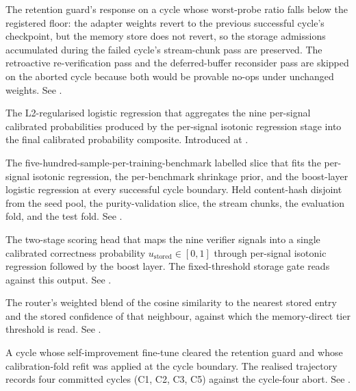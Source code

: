\begin{description}[style=nextline, leftmargin=0pt, labelindent=0pt, itemsep=6pt, parsep=0pt, font=\bfseries, beginpenalty=10000]

\item[Asymmetric rollback.] The retention guard's response on a cycle whose worst-probe ratio falls below the registered floor: the adapter weights revert to the previous successful cycle's checkpoint, but the memory store does not revert, so the storage admissions accumulated during the failed cycle's stream-chunk pass are preserved. The retroactive re-verification pass and the deferred-buffer reconsider pass are skipped on the aborted cycle because both would be provable no-ops under unchanged weights. See .

\item[Boost layer.] The L2-regularised logistic regression that aggregates the nine per-signal calibrated probabilities produced by the per-signal isotonic regression stage into the final calibrated probability composite. Introduced at .

\item[Calibration fold.] The five-hundred-sample-per-training-benchmark labelled slice that fits the per-signal isotonic regression, the per-benchmark shrinkage prior, and the boost-layer logistic regression at every successful cycle boundary. Held content-hash disjoint from the seed pool, the purity-validation slice, the stream chunks, the evaluation fold, and the test fold. See .

\item[Calibrated-probability composite.] The two-stage scoring head that maps the nine verifier signals into a single calibrated correctness probability $u_{\text{stored}} \in [0, 1]$ through per-signal isotonic regression followed by the boost layer. The fixed-threshold storage gate reads against this output. See .

\item[Combined dispatch score.] The router's weighted blend of the cosine similarity to the nearest stored entry and the stored confidence of that neighbour, against which the memory-direct tier threshold is read. See .

\item[Committed cycle.] A cycle whose self-improvement fine-tune cleared the retention guard and whose calibration-fold refit was applied at the cycle boundary. The realised trajectory records four committed cycles (C1, C2, C3, C5) against the cycle-four abort. See .


\end{description}
